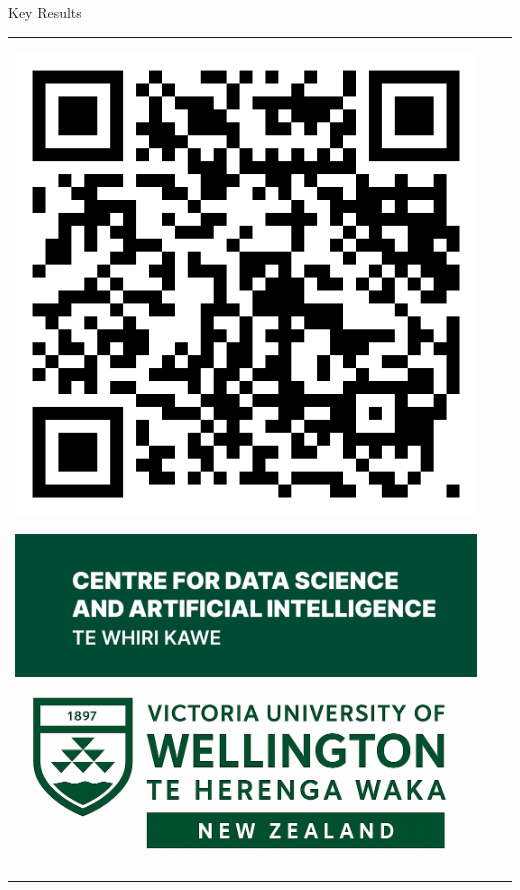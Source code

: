 \documentclass[final]{beamer}
\newlength{\onecolwid}
\begin{document}
\begin{frame}[t]
\begin{columns}[t]
\begin{column}{\onecolwid}
\begin{block}{Key Results}
                    \begin{center}
                        \begin{tabular}{ccc}
                            \parbox[c][3.5in][c]{0.3\linewidth}{
                                \includegraphics[width=\linewidth]{figs/QR.png}
                            }
                            \hspace{0.03\linewidth}
                            \parbox[c][3.5in][c]{0.3\linewidth}{
                                \vspace{8mm}
                                \includegraphics[width=\linewidth]{figs/AI_Center.png}\\[1ex]
                                \includegraphics[width=\linewidth]{figs/VUW-W.png}
}
\end{tabular}
\end{center}
\end{block}
\end{column}
\end{columns}
\end{frame}
\end{document}
